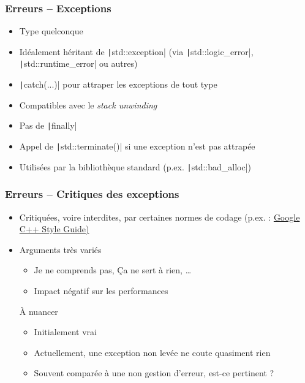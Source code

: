 \documentclass[C++.tex]{subfiles}
\begin{document}
\begin{frame}[fragile]
	\frametitle{Erreurs -- Exceptions}
	\begin{itemize}
		\item Type quelconque
		\item Idéalement héritant de \texttt|std::exception| (via \texttt|std::logic_error|, \texttt|std::runtime_error| ou autres)
		\item \texttt|catch(...)| pour attraper les exceptions de tout type
		\item Compatibles avec le \textit{stack unwinding}


		\item Pas de \texttt|finally|
		\item Appel de \texttt|std::terminate()| si une exception n'est pas attrapée


		\item Utilisées par la bibliothèque standard (p.ex. \texttt|std::bad_alloc|)
	\end{itemize}
\end{frame}

\begin{frame}[fragile]
	\frametitle{Erreurs -- Critiques des exceptions}
	\begin{itemize}
		\item Critiquées, voire interdites, par certaines normes de codage (p.ex. : \href{https://google.github.io/styleguide/cppguide.html}{Google C++ Style Guide)}
		\item Arguments très variés
		\begin{itemize}
			\item \og Je ne comprends pas\fg{}, \og Ça ne sert à rien\fg{}, \ldots{}
			\item Impact négatif sur les performances
		\end{itemize}

		\begin{block}{À nuancer}
			\begin{itemize}
				\item Initialement vrai
				\item Actuellement, une exception non levée ne coute quasiment rien
				\item Souvent comparée à une non gestion d'erreur, est-ce pertinent ? 
			\end{itemize}
		\end{block}
	\end{itemize}
\end{frame}
\end{document}
